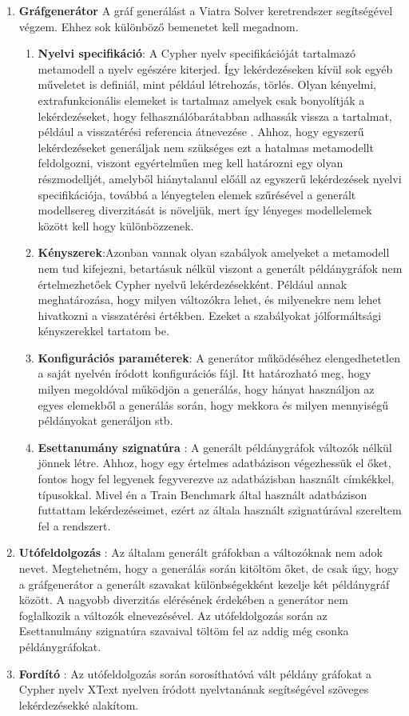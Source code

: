 \begin{enumerate}
	\item \textbf{Gráfgenerátor}
	A gráf generálást a Viatra Solver keretrendszer  segítségével végzem. Ehhez sok különböző bemenetet kell megadnom. 
	\begin{enumerate}
		\item\textbf{Nyelvi specifikáció}: A Cypher nyelv specifikációját tartalmazó metamodell a nyelv egészére kiterjed. Így lekérdezéseken kívül sok egyéb műveletet is definiál, mint például létrehozás, törlés. Olyan kényelmi, extrafunkcionális elemeket is tartalmaz amelyek csak bonyolítják a lekérdezéseket, hogy felhasználóbarátabban adhassák vissza a tartalmat, például a visszatérési referencia átnevezése . Ahhoz, hogy egyszerű lekérdezéseket generáljak nem szükséges ezt a hatalmas metamodellt feldolgozni, viszont egyértelműen meg kell határozni egy olyan részmodelljét, amelyből hiánytalanul előáll az egyszerű lekérdezések nyelvi specifikációja, továbbá a lényegtelen elemek szűrésével a generált modellsereg diverzitását is növeljük, mert így lényeges modellelemek között kell hogy különbözzenek. 
		\item\textbf{Kényszerek}:Azonban vannak	olyan szabályok amelyeket a metamodell nem tud kifejezni, betartásuk nélkül viszont a generált példánygráfok nem értelmezhetőek Cypher nyelvű lekérdezésekként. Például annak meghatározása, hogy milyen változókra lehet, és milyenekre nem lehet hivatkozni a visszatérési értékben. Ezeket a szabályokat jólformáltsági kényszerekkel tartatom be. 
		\item\textbf{Konfigurációs paraméterek}: A generátor működéséhez elengedhetetlen a saját nyelvén íródott konfigurációs fájl. Itt határozható meg, hogy milyen megoldóval működjön a generálás, hogy hányat használjon az egyes elemekből a generálás során, hogy mekkora és milyen mennyiségű példányokat generáljon stb.  
		\item\textbf{Esettanumány szignatúra} : A generált példánygráfok változók nélkül jönnek létre. Ahhoz, hogy egy értelmes adatbázison végezhessük el őket, fontos hogy fel legyenek fegyverezve az adatbázisban használt címkékkel, típusokkal. Mivel én a Train Benchmark által használt adatbázison futtattam lekérdezéseimet, ezért az általa használt szignatúrával szereltem fel a rendszert. 
	\end{enumerate}
	\item \textbf{Utófeldolgozás} : Az általam generált gráfokban a változóknak nem adok nevet. Megtehetném, hogy a generálás során kitöltöm őket, de csak úgy, hogy a gráfgenerátor a generált szavakat különbségekként kezelje két példánygráf között. A nagyobb diverzitás elérésének érdekében a generátor nem foglalkozik a változók elnevezésével. Az utófeldolgozás során az Esettanulmány szignatúra szavaival töltöm fel az addig még csonka példánygráfokat.    
	\item \textbf{Fordító} : Az utófeldolgozás során sorosíthatóvá vált példány gráfokat a Cypher nyelv XText nyelven íródott nyelvtanának segítségével szöveges lekérdezésekké alakítom.  
\end{enumerate}



